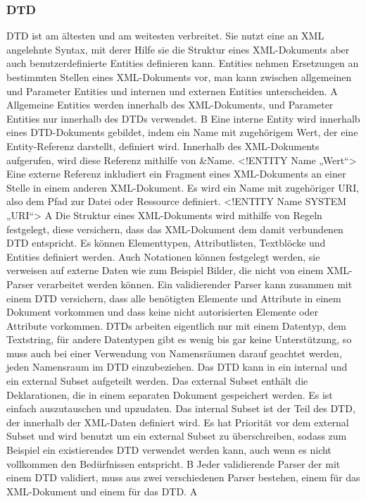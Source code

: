 \subsubsection*{DTD}
DTD ist am ältesten und am weitesten verbreitet.  Sie nutzt eine an XML angelehnte Syntax, mit derer Hilfe sie die Struktur eines XML-Dokuments aber auch benutzerdefinierte Entities definieren kann. Entities nehmen Ersetzungen an bestimmten Stellen eines XML-Dokuments vor, man kann zwischen  allgemeinen und Parameter Entities und internen und externen Entities unterscheiden. A
Allgemeine Entities werden innerhalb des XML-Dokuments, und Parameter Entities nur innerhalb des DTDs verwendet. B
 Eine interne Entity wird innerhalb eines DTD-Dokuments gebildet, indem ein Name mit zugehörigem Wert, der eine Entity-Referenz darstellt, definiert wird. Innerhalb des XML-Dokuments aufgerufen, wird diese Referenz mithilfe von &Name. 
<!ENTITY Name „Wert“>
Eine externe Referenz  inkludiert ein Fragment eines XML-Dokuments an einer Stelle in einem anderen XML-Dokument.  Es wird ein Name mit zugehöriger URI, also dem Pfad zur Datei oder Ressource definiert. 
<!ENTITY Name SYSTEM „URI“> A
Die Struktur eines XML-Dokuments wird mithilfe von Regeln festgelegt, diese versichern, dass das XML-Dokument dem damit verbundenen DTD entspricht. Es können Elementtypen, Attributlisten, Textblöcke und Entities definiert werden. Auch Notationen können festgelegt werden, sie verweisen auf externe Daten wie zum Beispiel Bilder, die nicht von einem XML-Parser verarbeitet werden können.  Ein validierender Parser kann zusammen mit einem DTD versichern, dass alle benötigten Elemente und Attribute in einem Dokument vorkommen und dass keine nicht autorisierten Elemente oder Attribute vorkommen. DTDs arbeiten eigentlich nur mit einem Datentyp, dem Textstring, für andere Datentypen gibt es wenig bis gar keine Unterstützung, so muss auch bei einer Verwendung von Namensräumen darauf geachtet werden, jeden Namensraum im DTD einzubeziehen. 
Das DTD kann in ein internal und ein external Subset aufgeteilt werden. Das external Subset enthält die Deklarationen, die in einem separaten Dokument gespeichert werden. Es ist einfach auszutauschen und upzudaten. Das internal Subset ist der Teil des DTD, der innerhalb der XML-Daten definiert wird. Es hat Priorität vor dem external Subset und wird benutzt um ein external Subset zu überschreiben, sodass zum Beispiel ein existierendes DTD verwendet werden kann, auch wenn es nicht vollkommen den Bedürfnissen entspricht. B
Jeder validierende Parser der mit einem DTD validiert, muss aus zwei verschiedenen Parser bestehen, einem für das XML-Dokument und einem für das DTD. A
